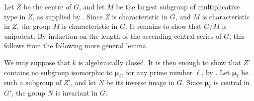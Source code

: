 

Let \(Z\) be the centre of \(G\), and let \(M\) be the largest
subgroup of multiplicative type in \(Z\), as supplied by .
Since \(Z\) is characteristic in \(G\), and \(M\) is
characteristic in \(Z\), the group \(M\) is characteristic in
\(G\).  It remains to show that \(G/M\) is unipotent.  By
induction on the length of the ascending central series of \(G\),
this follows from the following more general lemma.


We may suppose that \(k\) is algebraically closed.  It is then
enough to show that \(Z'\) contains no subgroup isomorphic to
\(\boldsymbol\mu_\ell\), for any prime number \(\ell\), by
.  Let \(\boldsymbol\mu_\ell\) be such a subgroup of
\(Z'\), and let \(N\) be its inverse image in \(G\).  Since
\(\boldsymbol\mu_\ell\) is central in \(G'\), the group \(N\) is
invariant in \(G\).

